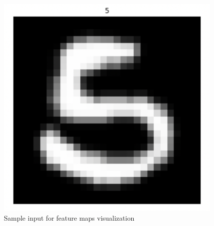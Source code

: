 \documentclass[conference]{IEEEtran}
\begin{document}
\begin{figure}[h!]
\centering
\includegraphics[width=0.8\linewidth]{images/xtrain.jpg}
\caption{Sample input for feature maps visualization}
\label{fig:xtrain}
\end{figure}
\end{document}
